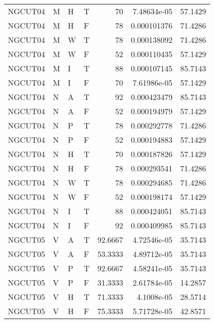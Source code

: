 \begin{longtable}{llllrrr}
    NGCUT04  & M     & H     & T          & 70         & 7.48634e-05 & 57.1429  \\
    NGCUT04  & M     & H     & F          & 78         & 0.000101376 & 71.4286  \\
    NGCUT04  & M     & W     & T          & 78         & 0.000138092 & 71.4286  \\
    NGCUT04  & M     & W     & F          & 52         & 0.000110435 & 57.1429  \\
    NGCUT04  & M     & I     & T          & 88         & 0.000107145 & 85.7143  \\
    NGCUT04  & M     & I     & F          & 70         & 7.61986e-05 & 57.1429  \\
    NGCUT04  & N     & A     & T          & 92         & 0.000423479 & 85.7143  \\
    NGCUT04  & N     & A     & F          & 52         & 0.000194979 & 57.1429  \\
    NGCUT04  & N     & P     & T          & 78         & 0.000292778 & 71.4286  \\
    NGCUT04  & N     & P     & F          & 52         & 0.000194883 & 57.1429  \\
    NGCUT04  & N     & H     & T          & 70         & 0.000187826 & 57.1429  \\
    NGCUT04  & N     & H     & F          & 78         & 0.000293541 & 71.4286  \\
    NGCUT04  & N     & W     & T          & 78         & 0.000294685 & 71.4286  \\
    NGCUT04  & N     & W     & F          & 52         & 0.000198174 & 57.1429  \\
    NGCUT04  & N     & I     & T          & 88         & 0.000424051 & 85.7143  \\
    NGCUT04  & N     & I     & F          & 92         & 0.000409985 & 85.7143  \\
    NGCUT05  & V     & A     & T          & 92.6667    & 4.72546e-05 & 35.7143  \\
    NGCUT05  & V     & A     & F          & 53.3333    & 4.89712e-05 & 35.7143  \\
    NGCUT05  & V     & P     & T          & 92.6667    & 4.58241e-05 & 35.7143  \\
    NGCUT05  & V     & P     & F          & 31.3333    & 2.61784e-05 & 14.2857  \\
    NGCUT05  & V     & H     & T          & 71.3333    & 4.1008e-05  & 28.5714  \\
    NGCUT05  & V     & H     & F          & 75.3333    & 5.71728e-05 & 42.8571  \\

\end{longtable}
